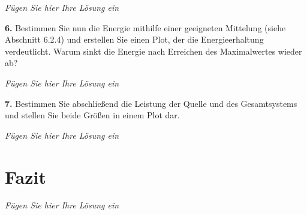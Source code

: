 \documentclass[Protokollheft.tex]{subfiles}
\begin{document}
\emph{Fügen Sie hier Ihre Lösung ein}

\begin{framed}
	\noindent \textbf{6.} Bestimmen Sie nun die Energie mithilfe einer geeigneten Mittelung (siehe Abschnitt 6.2.4) und erstellen Sie einen Plot, der die Energieerhaltung verdeutlicht. Warum sinkt die Energie nach Erreichen des Maximalwertes wieder ab?\label{exer:energyConservation}
\end{framed}

\emph{Fügen Sie hier Ihre Lösung ein}

\begin{framed}
	\noindent \textbf{7.} Bestimmen Sie abschließend die Leistung der Quelle und des Gesamtsystems und stellen Sie beide Größen in einem Plot dar.\label{exer:powerPlot}
\end{framed}

\emph{Fügen Sie hier Ihre Lösung ein}



\section{Fazit}
\emph{Fügen Sie hier Ihre Lösung ein}
\end{document}
